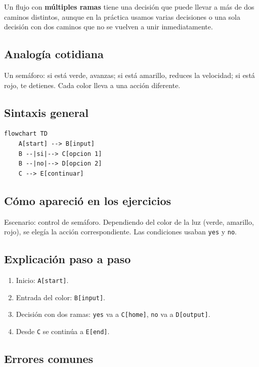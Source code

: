 \documentclass[12pt]{article}
\begin{document}
Un flujo con \textbf{múltiples ramas} tiene una decisión que puede llevar a más de dos caminos distintos, aunque en la práctica usamos varias decisiones o una sola decisión con dos caminos que no se vuelven a unir inmediatamente.

\subsection{Analogía cotidiana}

Un semáforo: si está verde, avanzas; si está amarillo, reduces la velocidad; si está rojo, te detienes. Cada color lleva a una acción diferente.

\subsection{Sintaxis general}

\begin{lstlisting}[style=mermaidstyle]
flowchart TD
    A[start] --> B[input]
    B --|si|--> C[opcion 1]
    B --|no|--> D[opcion 2]
    C --> E[continuar]
\end{lstlisting}

\subsection{Cómo apareció en los ejercicios}

Escenario: control de semáforo. Dependiendo del color de la luz (verde, amarillo, rojo), se elegía la acción correspondiente. Las condiciones usaban \texttt{yes} y \texttt{no}.

\subsection{Explicación paso a paso}

\begin{enumerate}
    \item Inicio: \texttt{A[start]}.
    \item Entrada del color: \texttt{B[input]}.
    \item Decisión con dos ramas: \texttt{yes} va a \texttt{C[home]}, \texttt{no} va a \texttt{D[output]}.
    \item Desde \texttt{C} se continúa a \texttt{E[end]}.
\end{enumerate}

\subsection{Errores comunes}
\end{document}

